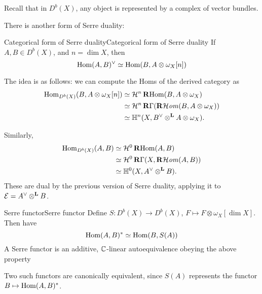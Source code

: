 Recall that in $D^b(X)$, any object is represented by a complex of vector bundles.

There is another form of Serre duality:

\begin{proposition}{Categorical form of Serre duality}{Categorical form of Serre duality}
    If $A,B\in D^b(X)$, and $n=\dim X$, then
    \begin{equation*}
        \operatorname{Hom}(A,B)^\vee \simeq \operatorname{Hom}(B,A\otimes\omega_X[n])
    \end{equation*}
\end{proposition}

The idea is as follows: we can compute the Homs of the derived category as
\begin{align*}
    \operatorname{Hom}_{D^b(X)}(B,A\otimes\omega_X[n])
        &\simeq \mathcal{H}^n\operatorname{\mathbf{R} Hom}(B,A\otimes\omega_X) \\
        &\simeq \mathcal{H}^n\operatorname{\mathbf{R}\Gamma}(\operatorname{\mathbf{R}\mathcal{H}\mathit{om}}(B,A\otimes\omega_X)) \\
        &\simeq \mathbb{H}^n(X,B^\vee\otimes^{\mathbf{L}} A\otimes\omega_X).
\end{align*}

Similarly,
\begin{align*}
    \operatorname{Hom}_{D^b(X)}(A,B)
        &\simeq \mathcal{H}^0\operatorname{\mathbf{R} Hom}(A,B) \\
        &\simeq \mathcal{H}^0\operatorname{\mathbf{R}\Gamma}(X,\operatorname{\mathbf{R}\mathcal{H}\mathit{om}}(A,B)) \\
        &\simeq \mathbb{H}^0(X,A^\vee\otimes^{\mathbf{L}} B).
\end{align*}
These are dual by the previous version of Serre duality, applying it to $\mathcal{E}=A^\vee\otimes^{\mathbf{L}} B$.

\begin{definition}{Serre functor}{Serre functor}
    Define $S:D^b(X)\to D^b(X)$, $F\mapsto F\otimes\omega_X[\dim X]$. Then have
    \begin{equation*}
        \operatorname{Hom}(A,B)^*\simeq\operatorname{Hom}(B,S(A))
    \end{equation*}
     A Serre functor is an additive, $\mathbb{C}$-linear autoequivalence obeying the above property
\end{definition}

Two such functors are canonically equivalent, since $S(A)$ represents the functor $B\mapsto\operatorname{Hom}(A,B)^*$.



